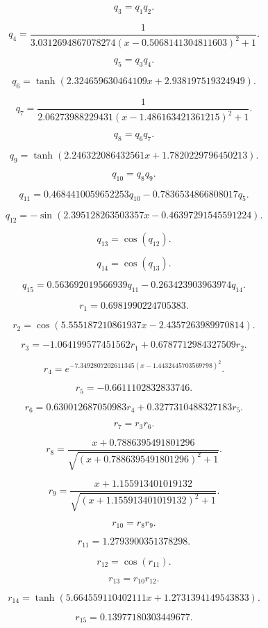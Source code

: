 \[q_{3}=q_{1} q_{2}.\]

\[q_{4}=\frac{1}{3.0312694867078274 \left(x - 0.5068141304811603\right)^{2} + 1}.\]

\[q_{5}=q_{3} q_{4}.\]

\[q_{6}=\tanh{\left(2.324659630464109 x + 2.938197519324949 \right)}.\]

\[q_{7}=\frac{1}{2.06273988229431 \left(x - 1.486163421361215\right)^{2} + 1}.\]

\[q_{8}=q_{6} q_{7}.\]

\[q_{9}=\tanh{\left(2.246322086432561 x + 1.7820229796450213 \right)}.\]

\[q_{10}=q_{8} q_{9}.\]

\[q_{11}=0.4684410059652253 q_{10} - 0.7836534866808017 q_{5}.\]

\[q_{12}=- \sin{\left(2.395128263503357 x - 0.46397291545591224 \right)}.\]

\[q_{13}=\cos{\left(q_{12} \right)}.\]

\[q_{14}=\cos{\left(q_{13} \right)}.\]

\[q_{15}=0.563692019566939 q_{11} - 0.263423903963974 q_{14}.\]

\[r_{1}=0.6981990224705383.\]

\[r_{2}=\cos{\left(5.555187210861937 x - 2.4357263989970814 \right)}.\]

\[r_{3}=- 1.064199577451562 r_{1} + 0.6787712984327509 r_{2}.\]

\[r_{4}=e^{- 7.3492807202611345 \left(x - 1.4432445703569798\right)^{2}}.\]

\[r_{5}=-0.6611102832833746.\]

\[r_{6}=0.630012687050983 r_{4} + 0.3277310488327183 r_{5}.\]

\[r_{7}=r_{3} r_{6}.\]

\[r_{8}=\frac{x + 0.7886395491801296}{\sqrt{\left(x + 0.7886395491801296\right)^{2} + 1}}.\]

\[r_{9}=\frac{x + 1.155913401019132}{\sqrt{\left(x + 1.155913401019132\right)^{2} + 1}}.\]

\[r_{10}=r_{8} r_{9}.\]

\[r_{11}=1.2793900351378298.\]

\[r_{12}=\cos{\left(r_{11} \right)}.\]

\[r_{13}=r_{10} r_{12}.\]

\[r_{14}=\tanh{\left(5.664559110402111 x + 1.2731394149543833 \right)}.\]

\[r_{15}=0.13977180303449677.\]

